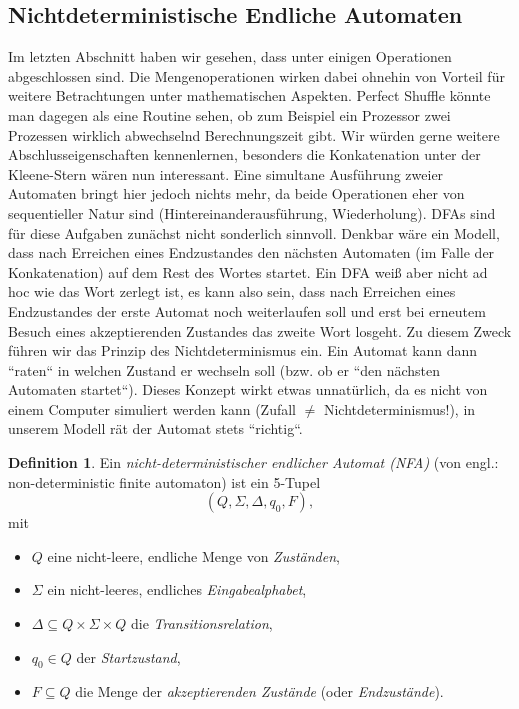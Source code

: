 \documentclass[11pt, a4paper]{article}
\theoremstyle{definition}
\newtheorem{definition}{Definition}[section]
\theoremstyle{plain}
\numberwithin{equation}{section}
\begin{document}
\subsection{Nichtdeterministische Endliche Automaten}\label{sec:regular_nfa}
Im letzten Abschnitt haben wir gesehen, dass unter einigen Operationen abgeschlossen sind. Die Mengenoperationen wirken dabei ohnehin von Vorteil für weitere Betrachtungen unter mathematischen Aspekten. Perfect Shuffle könnte man dagegen als eine Routine sehen, ob zum Beispiel ein Prozessor zwei Prozessen wirklich abwechselnd Berechnungszeit gibt. Wir würden gerne weitere Abschlusseigenschaften kennenlernen, besonders die Konkatenation unter der Kleene-Stern wären nun interessant. Eine simultane Ausführung zweier Automaten bringt hier jedoch nichts mehr, da beide Operationen eher von sequentieller Natur sind (Hintereinanderausführung, Wiederholung). DFAs sind für diese Aufgaben zunächst nicht sonderlich sinnvoll. Denkbar wäre ein Modell, dass nach Erreichen eines Endzustandes den nächsten Automaten (im Falle der Konkatenation) auf dem Rest des Wortes startet. Ein DFA weiß aber nicht ad hoc wie das Wort zerlegt ist, es kann also sein, dass nach Erreichen eines Endzustandes der erste Automat noch weiterlaufen soll und erst bei erneutem Besuch eines akzeptierenden Zustandes das zweite Wort losgeht. Zu diesem Zweck führen wir das Prinzip des Nichtdeterminismus ein. Ein Automat kann dann ``raten`` in welchen Zustand er wechseln soll (bzw. ob er ``den nächsten Automaten startet``). Dieses Konzept wirkt etwas unnatürlich, da es nicht von einem Computer simuliert werden kann (Zufall \( \neq \) Nichtdeterminismus!), in unserem Modell rät der Automat stets ``richtig``.
\begin{definition}
	Ein \textit{nicht-deterministischer endlicher Automat (NFA)} (von engl.: non-deterministic finite automaton) ist ein 5-Tupel
	\[
		(Q, \Sigma, \Delta, q_0, F),
	\]
	mit
	\begin{itemize}
		\item \( Q \) eine nicht-leere, endliche Menge von \textit{Zuständen},
		\item \( \Sigma \) ein nicht-leeres, endliches \textit{Eingabealphabet},
		\item \( \Delta \subseteq Q \times \Sigma \times Q \) die \textit{Transitionsrelation},
		\item \( q_0 \in Q \) der \textit{Startzustand},
		\item \(F \subseteq Q \) die Menge der \textit{akzeptierenden Zustände} (oder \textit{Endzustände}).
	\end{itemize}
\end{definition}
\end{document}
